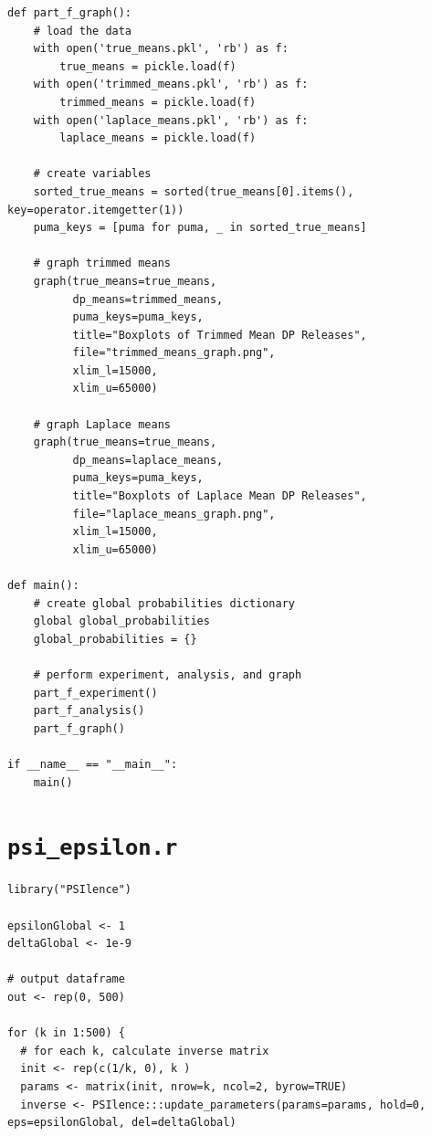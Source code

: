 \documentclass[12pt]{article}
\def\cl{\lstinline}
\begin{document}
\begin{appendices}
\begin{lstlisting}
def part_f_graph():
    # load the data
    with open('true_means.pkl', 'rb') as f:
        true_means = pickle.load(f)
    with open('trimmed_means.pkl', 'rb') as f:
        trimmed_means = pickle.load(f)
    with open('laplace_means.pkl', 'rb') as f:
        laplace_means = pickle.load(f)

    # create variables
    sorted_true_means = sorted(true_means[0].items(), key=operator.itemgetter(1))
    puma_keys = [puma for puma, _ in sorted_true_means]

    # graph trimmed means
    graph(true_means=true_means,
          dp_means=trimmed_means,
          puma_keys=puma_keys,
          title="Boxplots of Trimmed Mean DP Releases",
          file="trimmed_means_graph.png",
          xlim_l=15000,
          xlim_u=65000)

    # graph Laplace means
    graph(true_means=true_means,
          dp_means=laplace_means,
          puma_keys=puma_keys,
          title="Boxplots of Laplace Mean DP Releases",
          file="laplace_means_graph.png",
          xlim_l=15000,
          xlim_u=65000)

def main():
    # create global probabilities dictionary
    global global_probabilities
    global_probabilities = {}

    # perform experiment, analysis, and graph
    part_f_experiment()
    part_f_analysis()
    part_f_graph()

if __name__ == "__main__":
    main()
\end{lstlisting}

\newpage

\section{\cl{psi_epsilon.r}}
\label{appendix:psi_epsilon}

{

\begin{lstlisting}
library("PSIlence")

epsilonGlobal <- 1
deltaGlobal <- 1e-9

# output dataframe
out <- rep(0, 500)

for (k in 1:500) {
  # for each k, calculate inverse matrix
  init <- rep(c(1/k, 0), k )
  params <- matrix(init, nrow=k, ncol=2, byrow=TRUE)
  inverse <- PSIlence:::update_parameters(params=params, hold=0, eps=epsilonGlobal, del=deltaGlobal)
  

\end{lstlisting}}
\end{appendices}
\end{document}
